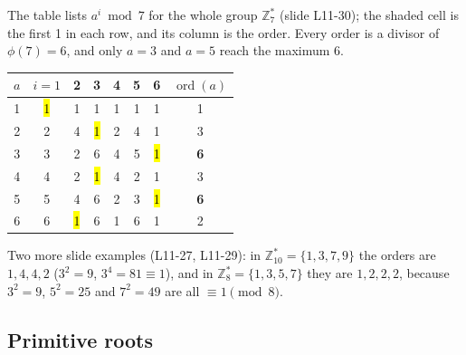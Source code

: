 The table lists $a^i \bmod 7$ for the whole group $\mathbb{Z}_7^*$ (slide L11-30); the shaded cell is the first 1 in each row, and its column is the order. Every order is a divisor of $\phi(7) = 6$, and only $a = 3$ and $a = 5$ reach the maximum 6.
\begin{center}\small
\begin{tabular}{@{}c|cccccc|c@{}}
\toprule
$a$ & $i=1$ & 2 & 3 & 4 & 5 & 6 & $\operatorname{ord}(a)$\\
\midrule
1 & \hl{1} & 1 & 1 & 1 & 1 & 1 & 1\\
2 & 2 & 4 & \hl{1} & 2 & 4 & 1 & 3\\
3 & 3 & 2 & 6 & 4 & 5 & \hl{1} & \textbf{6}\\
4 & 4 & 2 & \hl{1} & 4 & 2 & 1 & 3\\
5 & 5 & 4 & 6 & 2 & 3 & \hl{1} & \textbf{6}\\
6 & 6 & \hl{1} & 6 & 1 & 6 & 1 & 2\\
\bottomrule
\end{tabular}
\end{center}
Two more slide examples (L11-27, L11-29): in $\mathbb{Z}_{10}^* = \{1, 3, 7, 9\}$ the orders are $1, 4, 4, 2$ ($3^2 = 9$, $3^4 = 81 \equiv 1$), and in $\mathbb{Z}_8^* = \{1, 3, 5, 7\}$ they are $1, 2, 2, 2$, because $3^2 = 9$, $5^2 = 25$ and $7^2 = 49$ are all $\equiv 1 \pmod 8$.

\subsection{Primitive roots \hot}

